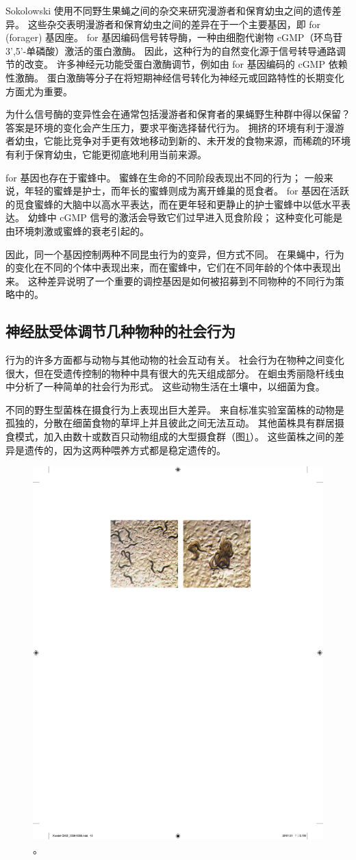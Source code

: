 Sokolowski 使用不同野生果蝇之间的杂交来研究漫游者和保育幼虫之间的遗传差异。 
这些杂交表明漫游者和保育幼虫之间的差异在于一个主要基因，即 for (forager) 基因座。 
for 基因编码信号转导酶，一种由细胞代谢物 cGMP（环鸟苷 3',5'-单磷酸）激活的蛋白激酶。 
因此，这种行为的自然变化源于信号转导通路调节的改变。 
许多神经元功能受蛋白激酶调节，例如由 for 基因编码的 cGMP 依赖性激酶。 
蛋白激酶等分子在将短期神经信号转化为神经元或回路特性的长期变化方面尤为重要。


为什么信号酶的变异性会在通常包括漫游者和保育者的果蝇野生种群中得以保留？ 
答案是环境的变化会产生压力，要求平衡选择替代行为。 
拥挤的环境有利于漫游者幼虫，它能比竞争对手更有效地移动到新的、未开发的食物来源，而稀疏的环境有利于保育幼虫，它能更彻底地利用当前来源。


for 基因也存在于蜜蜂中。 
蜜蜂在生命的不同阶段表现出不同的行为； 
一般来说，年轻的蜜蜂是护士，而年长的蜜蜂则成为离开蜂巢的觅食者。 
for 基因在活跃的觅食蜜蜂的大脑中以高水平表达，而在更年轻和更静止的护士蜜蜂中以低水平表达。 
幼蜂中 cGMP 信号的激活会导致它们过早进入觅食阶段； 
这种变化可能是由环境刺激或蜜蜂的衰老引起的。


因此，同一个基因控制两种不同昆虫行为的变异，但方式不同。 
在果蝇中，行为的变化在不同的个体中表现出来，而在蜜蜂中，它们在不同年龄的个体中表现出来。 
这种差异说明了一个重要的调控基因是如何被招募到不同物种的不同行为策略中的。


\subsection{神经肽受体调节几种物种的社会行为}
行为的许多方面都与动物与其他动物的社会互动有关。 
社会行为在物种之间变化很大，但在受遗传控制的物种中具有很大的先天组成部分。 
在蛔虫秀丽隐杆线虫中分析了一种简单的社会行为形式。 
这些动物生活在土壤中，以细菌为食。


不同的野生型菌株在摄食行为上表现出巨大差异。 
来自标准实验室菌株的动物是孤独的，分散在细菌食物的草坪上并且彼此之间无法互动。 
其他菌株具有群居摄食模式，加入由数十或数百只动物组成的大型摄食群（图\ref{fig:2_15}）。 
这些菌株之间的差异是遗传的，因为这两种喂养方式都是稳定遗传的。

\begin{figure}[htbp]
	\centering
	\includegraphics[width=0.5\linewidth]{chap02/fig_2_15}
	\caption{。}
	\label{fig:2_15}
\end{figure}




